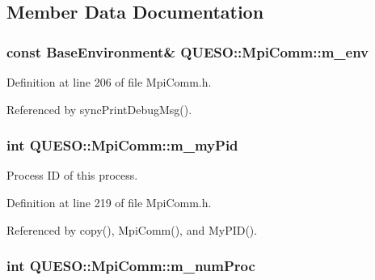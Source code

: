 \subsection{Member Data Documentation}
\hypertarget{class_q_u_e_s_o_1_1_mpi_comm_a6b63af09a9b80f14b25409bc561abb41}{
\subsubsection[{m\-\_\-env}]{\setlength{\rightskip}{0pt plus 5cm}const {\bf Base\-Environment}\& Q\-U\-E\-S\-O\-::\-Mpi\-Comm\-::m\-\_\-env\hspace{0.3cm}{\ttfamily [private]}}}\label{class_q_u_e_s_o_1_1_mpi_comm_a6b63af09a9b80f14b25409bc561abb41}


Definition at line 206 of file Mpi\-Comm.\-h.



Referenced by sync\-Print\-Debug\-Msg().

\hypertarget{class_q_u_e_s_o_1_1_mpi_comm_aca028ecbe31a1eafa0e0bf93b331bcb9}{
\subsubsection[{m\-\_\-my\-Pid}]{\setlength{\rightskip}{0pt plus 5cm}int Q\-U\-E\-S\-O\-::\-Mpi\-Comm\-::m\-\_\-my\-Pid\hspace{0.3cm}{\ttfamily [private]}}}\label{class_q_u_e_s_o_1_1_mpi_comm_aca028ecbe31a1eafa0e0bf93b331bcb9}


Process I\-D of this process. 



Definition at line 219 of file Mpi\-Comm.\-h.



Referenced by copy(), Mpi\-Comm(), and My\-P\-I\-D().

\hypertarget{class_q_u_e_s_o_1_1_mpi_comm_a73c6f34523215042d866680b3e9a1497}{
\subsubsection[{m\-\_\-num\-Proc}]{\setlength{\rightskip}{0pt plus 5cm}int Q\-U\-E\-S\-O\-::\-Mpi\-Comm\-::m\-\_\-num\-Proc\hspace{0.3cm}{\ttfamily [private]}}}\label{class_q_u_e_s_o_1_1_mpi_comm_a73c6f34523215042d866680b3e9a1497}


